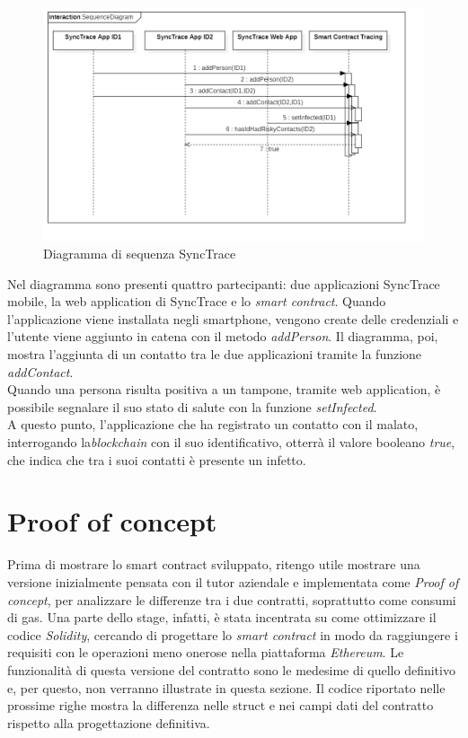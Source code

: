 \begin{figure}[h]
\caption{Diagramma di sequenza SyncTrace}
\centering
\includegraphics[width=1.0\textwidth]{./immagini/sequenza.png}
\end{figure}

Nel diagramma sono presenti quattro partecipanti: due applicazioni SyncTrace mobile, la web application di SyncTrace e lo \textit{smart contract}.
Quando l'applicazione viene installata negli smartphone, vengono create delle credenziali e l'utente viene aggiunto in catena con il metodo \textit{addPerson}.
Il diagramma, poi, mostra l'aggiunta di un contatto tra le due applicazioni tramite la funzione \textit{addContact}.\\ 
Quando una persona risulta positiva a un tampone, tramite web application, è possibile segnalare il suo stato di salute con la funzione \textit{setInfected}.\\
A questo punto, l'applicazione che ha registrato un contatto con il malato, interrogando la\textit{blockchain} con il suo identificativo, otterrà il valore booleano \textit{true}, che indica che tra i suoi contatti è presente un infetto.


\section{Proof of concept}
Prima di mostrare lo smart contract sviluppato, ritengo utile mostrare una versione inizialmente pensata con il tutor aziendale e implementata come \emph{\gls{Proof of concept}}\glsfirstoccur, per analizzare le differenze tra i due contratti, soprattutto come consumi di gas. Una parte dello stage, infatti, è stata incentrata su come ottimizzare il codice \textit{Solidity}, cercando di progettare lo \textit{smart contract} in modo da raggiungere i requisiti con le operazioni meno onerose nella piattaforma \textit{Ethereum}.
Le funzionalità di questa versione del contratto sono le medesime di quello definitivo e, per questo, non verranno illustrate in questa sezione.
Il codice riportato nelle prossime righe mostra la differenza nelle struct e nei campi dati del contratto rispetto alla progettazione definitiva.

